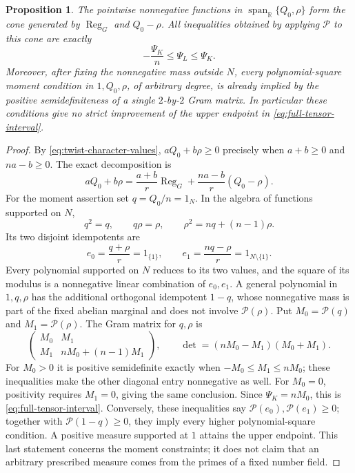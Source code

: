 \documentclass[11pt]{article}
\newtheorem{proposition}[theorem]{Proposition}
\theoremstyle{definition}
\theoremstyle{remark}
\begin{document}
\begin{proposition}\label{prop:full-tensor-cone}
The pointwise nonnegative functions in
\(\operatorname{span}_{\mathbb R}\{Q_0,\rho\}\) form the cone
generated by \(\operatorname{Reg}_G\) and \(Q_0-\rho\).
All inequalities obtained by applying \(\mathcal P\) to this cone
are exactly
\begin{equation}\label{eq:full-tensor-interval}
 -\frac{\Psi_K}{n}\leq\Psi_L\leq\Psi_K.
\end{equation}
Moreover, after fixing the nonnegative mass outside \(N\), every
polynomial-square moment condition in \(1,Q_0,\rho\), of arbitrary
degree, is already implied by the positive semidefiniteness of a
single \(2\)-by-\(2\) Gram matrix.
In particular these conditions give no strict improvement of the
upper endpoint in \eqref{eq:full-tensor-interval}.
\end{proposition}

\begin{proof}
By \eqref{eq:twist-character-values}, \(aQ_0+b\rho\geq0\) precisely when
\(a+b\geq0\) and \(na-b\geq0\). The exact decomposition is
\[
 aQ_0+b\rho
 =\frac{a+b}{r}\operatorname{Reg}_G
  +\frac{na-b}{r}(Q_0-\rho).
\]
For the moment assertion set \(q=Q_0/n=1_N\). In the algebra of
functions supported on \(N\),
\[
 q^2=q,\qquad q\rho=\rho,\qquad
 \rho^2=nq+(n-1)\rho.
\]
Its two disjoint idempotents are
\[
 e_0=\frac{q+\rho}{r}=1_{\{1\}},
 \qquad
 e_1=\frac{nq-\rho}{r}=1_{N\setminus\{1\}}.
\]
Every polynomial supported on \(N\) reduces to its two values, and
the square of its modulus is a nonnegative linear combination of
\(e_0,e_1\). A general polynomial in \(1,q,\rho\) has the additional
orthogonal idempotent \(1-q\), whose nonnegative mass is part of the
fixed abelian marginal and does not involve \(\mathcal P(\rho)\).
Put \(M_0=\mathcal P(q)\) and
\(M_1=\mathcal P(\rho)\). The Gram matrix for \(q,\rho\) is
\[
 \begin{pmatrix}
 M_0&M_1\\
 M_1&nM_0+(n-1)M_1
 \end{pmatrix},
 \qquad
 \det=(nM_0-M_1)(M_0+M_1).
\]
For \(M_0>0\) it is positive semidefinite exactly when
\(-M_0\leq M_1\leq nM_0\); these inequalities make the other diagonal
entry nonnegative as well. For \(M_0=0\), positivity requires
\(M_1=0\), giving the same conclusion. Since \(\Psi_K=nM_0\),
this is \eqref{eq:full-tensor-interval}.
Conversely, these inequalities say
\(\mathcal P(e_0),\mathcal P(e_1)\geq0\); together with
\(\mathcal P(1-q)\geq0\), they imply every higher
polynomial-square condition. A positive measure supported at \(1\)
attains the upper endpoint. This last statement concerns the moment
constraints; it does not claim that an arbitrary prescribed measure
comes from the primes of a fixed number field.
\end{proof}
\end{document}
